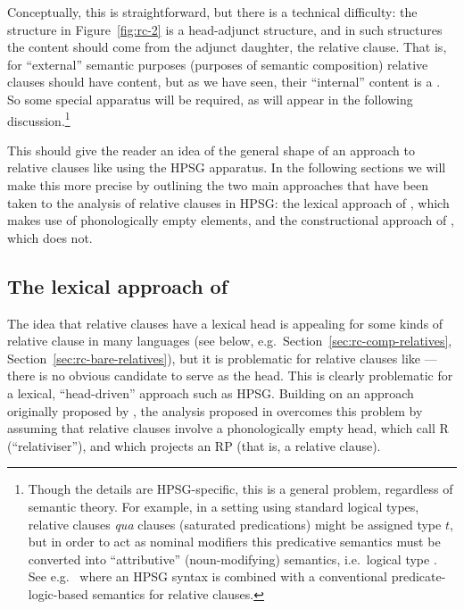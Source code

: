 \documentclass[output=paper,biblatex,babelshorthands,newtxmath,draftmode,colorlinks,citecolor=brown]{langscibook}
\begin{document}
\largerpage[-1]
Conceptually, this is straightforward, but there is a technical difficulty: the structure in
Figure~\ref{fig:rc-2} is a head-adjunct structure, and in such structures the content should
come from the adjunct daughter, the relative clause. That is, for ``external'' semantic
purposes (purposes of semantic composition) relative clauses should have
 content, but as we have seen, their ``internal'' content is a
. So some special apparatus will be required, as will appear in the following
discussion.\footnote{Though the details are HPSG-specific, this is a general problem,
  regardless of semantic theory. For example, in a setting using standard logical types,
  relative clauses \emph{qua} clauses (saturated predications) might be assigned type $t$,
  but in order to act as nominal modifiers this predicative semantics must be converted
  into ``attributive'' (noun-modifying) semantics, i.e.\  logical type
  . See e.g.\  where an HPSG syntax is combined with a conventional
  predicate-logic-based semantics for relative clauses. }

This should give the reader an idea of the general shape of an approach to relative
clauses like  using the HPSG apparatus. In the following sections we will make this
more precise by outlining the two main approaches that have been taken to the analysis of
relative clauses in HPSG: the lexical approach of \citet[Chapter~5]{Pollard:Sag:94}, which
makes use of phonologically empty elements, and the constructional approach of
\citet{Sag:97}, which does not.

\subsection{The lexical approach of }
\label{sec:rc-pollard--sag}

The idea that relative clauses have a lexical head is appealing for some kinds of relative
clause in many languages (see below, e.g.\ Section~\ref{sec:rc-comp-relatives},
Section~\ref{sec:rc-bare-relatives}), but it is problematic for relative clauses like
 --- there is no obvious candidate to serve as the head.  This is clearly
problematic for a lexical, ``head-driven'' approach such as HPSG. Building on an approach originally
proposed by \citet{borsley1989phrase}, the analysis proposed in
 overcomes this problem by assuming that relative clauses
involve a phonologically empty head, which \citeauthor{Pollard:Sag:94} call R
(``relativiser''), and which projects an RP (that is, a relative clause).
\end{document}
